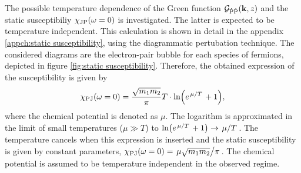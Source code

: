 The possible temperature dependence of the Green function $\mathcal{G}_{\dot{\mathrm{P}}\dot{\mathrm{P}}}(\vb{k}, z)$ and the static susceptibiliy $\chi_{\mathrm{JP}}(\omega = 0)$ is investigated.
The latter is expected to be temperature independent.
This calculation is shown in detail in the appendix \ref{appch:static susceptibility}, using the diagrammatic pertubation technique.
The considered diagrams are the electron-pair bubble for each species of fermions, depicted in figure \ref{fig:static susceptibility}.
Therefore, the obtained expression of the susceptibility is given by
%
\begin{align}
	\chi_{\mt{PJ}}(\omega = 0) = \frac{\sqrt{m_{1} m_{2}}}{\pi} T \cdot \ln(e^{\flatfrac{\mu}{T}} + 1),
	\label{eq:static susceptibility computed}
\end{align}
%
where the chemical potential is denoted as $\mu$.
The logarithm is approximated in the limit of small temperatures ($\mu \gg T$) to $\ln(e^{\flatfrac{\mu}{T}} + 1) \rightarrow \flatfrac{\mu}{T}$.
The temperature cancels when this expression is inserted and the static susceptibility is given by constant parameters, $\chi_{\mt{PJ}}(\omega = 0) = \flatfrac{\mu\sqrt{m_{1} m_{2}}}{\pi}$.
The chemical potential is assumed to be temperature independent in the observed regime.

